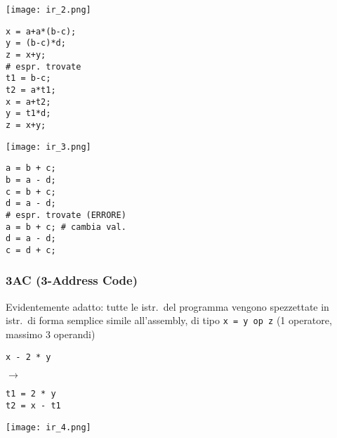 \begin{example}[frametitle={Esempi}]
   \noindent\begin{minipage}[c]{.2\textwidth}
   \texttt{[image: ir\_2.png]}
   \end{minipage}
   \begin{minipage}[c]{.23\textwidth}
      \begin{lstlisting}
x = a+a*(b-c);
y = (b-c)*d;
z = x+y;
# espr. trovate
t1 = b-c;
t2 = a*t1;
x = a+t2;
y = t1*d;
z = x+y;\end{lstlisting}
   \end{minipage}\hfill\vline
   \begin{minipage}[c]{.2\textwidth}
   \texttt{[image: ir\_3.png]}
   \end{minipage}
   \begin{minipage}[c]{.35\textwidth}
      \begin{lstlisting}
a = b + c;
b = a - d;
c = b + c;
d = a - d;
# espr. trovate (ERRORE)
a = b + c; # cambia val.
d = a - d;
c = d + c;\end{lstlisting}
   \end{minipage}
\end{example}



\subsubsection{3AC (3-Address Code)}

\begin{minipage}[c]{.65\textwidth}
Evidentemente adatto: tutte le istr.~del programma vengono spezzettate in istr.~di forma semplice simile all'assembly, di tipo \lstinline|x = y op z| (1 operatore, massimo 3 operandi)

\noindent
  \begin{minipage}[c]{.3\textwidth}
    \begin{lstlisting}
x - 2 * y\end{lstlisting}
  \end{minipage}
  $\rightarrow$
  \begin{minipage}[c]{.32\textwidth}
    \begin{lstlisting}
t1 = 2 * y
t2 = x - t1\end{lstlisting}
  \end{minipage}
\end{minipage}
  \hfill
  \begin{minipage}[c]{.3\textwidth}
  \texttt{[image: ir\_4.png]}
  \end{minipage}

